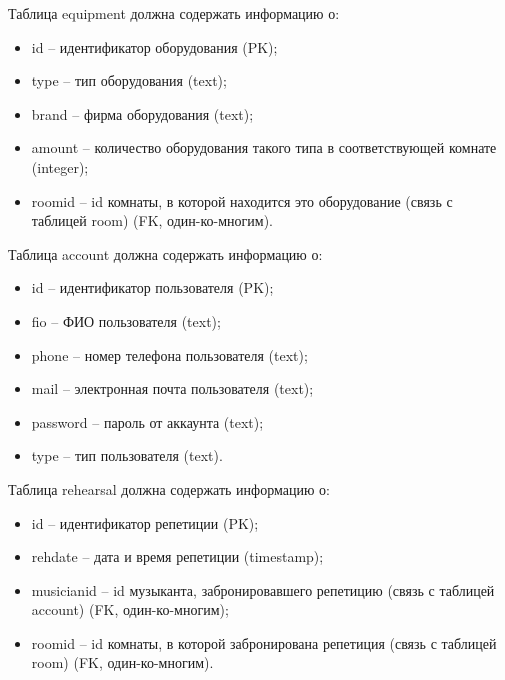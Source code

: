 Таблица equipment должна содержать информацию о:
\begin{itemize}
	\item id – идентификатор оборудования (PK);
	\item type – тип оборудования (text);
	\item brand – фирма оборудования (text);
	\item amount – количество оборудования такого типа в соответствующей комнате (integer);
	\item roomid – id комнаты, в которой находится это оборудование (связь с таблицей room) (FK, один-ко-многим).
\end{itemize}

Таблица account должна содержать информацию о:
\begin{itemize}
	\item id – идентификатор пользователя (PK);
	\item fio – ФИО пользователя (text);
	\item phone – номер телефона пользователя (text);
	\item mail – электронная почта пользователя (text);
	\item password – пароль от аккаунта (text);
	\item type – тип пользователя (text).
\end{itemize}

Таблица rehearsal должна содержать информацию о:
\begin{itemize}
	\item id – идентификатор репетиции (PK);
	\item rehdate – дата и время репетиции (timestamp);
	\item musicianid – id музыканта, забронировавшего репетицию (связь с таблицей account) (FK, один-ко-многим);
	\item roomid – id комнаты, в которой забронирована репетиция (связь с таблицей room) (FK, один-ко-многим).
\end{itemize}


